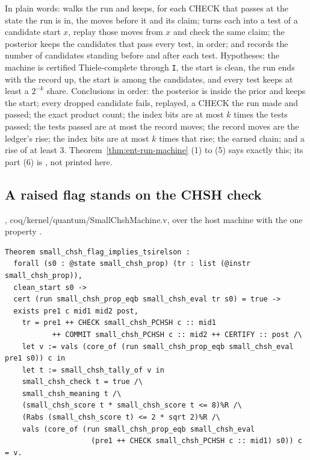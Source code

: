 In plain words:  walks the run and keeps, for each CHECK that passes at the state
the run is in, the moves before it and its claim;  turns each into a test of
a candidate start $x$, replay those moves from $x$ and check the same claim; the posterior keeps
the candidates that pass every test, in order; and  records the number of
candidates standing before and after each test. Hypotheses: the machine is certified Thiele-complete through
\texttt{I}, the start is clean, the run ends with the record up, the start is among the
candidates, and every test keeps at least a $2^{-k}$ share. Conclusions in order: the posterior is
inside the prior and keeps the start; every dropped candidate fails, replayed, a CHECK the run made
and passed; the exact product count; the index bits are at most $k$ times the tests passed; the
tests passed are at most the record moves; the record moves are the ledger's rise; the index bits
are at most $k$ times that rise; the earned chain; and a rise of at least 3.
Theorem~\ref{thm:ent-run-machine} (1) to (5) says exactly this; its part (6) is
, not printed here.

\subsection{A raised flag stands on the CHSH check}

{\raggedright {}, coq/kernel/quantum/SmallChshMachine.v, over the host machine with the one property .\par}

{\scriptsize
\begin{verbatim}
Theorem small_chsh_flag_implies_tsirelson :
  forall (s0 : @state small_chsh_prop) (tr : list (@instr small_chsh_prop)),
  clean_start s0 ->
  cert (run small_chsh_prop_eqb small_chsh_eval tr s0) = true ->
  exists pre1 c mid1 mid2 post,
    tr = pre1 ++ CHECK small_chsh_PCHSH c :: mid1
           ++ COMMIT small_chsh_PCHSH c :: mid2 ++ CERTIFY :: post /\
    let v := vals (core_of (run small_chsh_prop_eqb small_chsh_eval pre1 s0)) c in
    let t := small_chsh_tally_of v in
    small_chsh_check t = true /\
    small_chsh_meaning t /\
    (small_chsh_score t * small_chsh_score t <= 8)%R /\
    (Rabs (small_chsh_score t) <= 2 * sqrt 2)%R /\
    vals (core_of (run small_chsh_prop_eqb small_chsh_eval
                    (pre1 ++ CHECK small_chsh_PCHSH c :: mid1) s0)) c = v.
\end{verbatim}}

